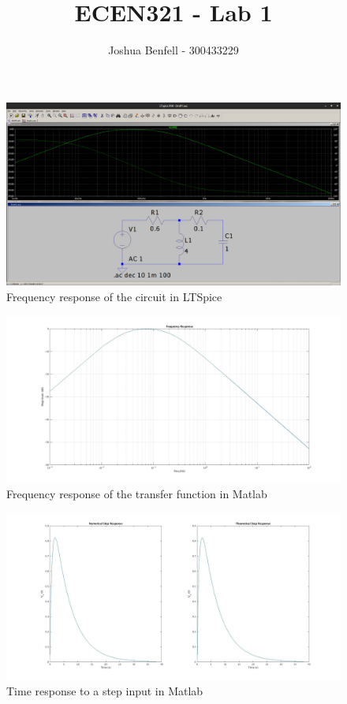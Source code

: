 \documentclass[a4paper, 12pt]{article}
\title{ECEN321 - Lab 1}
\author{Joshua Benfell - 300433229}
\begin{document}
    \begin{figure}[!h]
        \centering
        \includegraphics[width=\textwidth]{freqResponseSpice.png}
        \caption{Frequency response of the circuit in LTSpice}
        \label{fig:spiceF}
    \end{figure}
    \begin{figure}[!h]
        \centering
        \includegraphics[width=\textwidth]{freqResponseMatlab.jpg}
        \caption{Frequency response of the transfer function in Matlab}
        \label{fig:matlabF}
    \end{figure}
    \begin{figure}[!h]
        \centering
        \includegraphics[width=\textwidth]{timeresponseplots.jpg}
        \caption{Time response to a step input in Matlab}
        \label{fig:matlabT}
    \end{figure}
    \pagebreak
\end{document}
